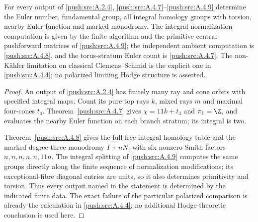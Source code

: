 \begin{corollary}\label{push:src:A.4.5}\label{push:A45}
For every output of \ref{push:src:A.2.4}, \ref{push:src:A.4.7}--\ref{push:src:A.4.9} determine the
Euler number, fundamental group, all integral homology
groups with torsion, nearby Euler function and marked
monodromy. The integral normalization computation is
given by the finite algorithm and the primitive
central pushforward matrices of \ref{push:src:A.4.9}; the independent
ambient computation is \ref{push:src:A.4.8}, and the torus-stratum
Euler count is \ref{push:src:A.4.7}. The non-K\"ahler limitation on
classical Clemens--Schmid is the explicit one in
\ref{push:src:A.4.4}; no polarized limiting Hodge structure is
asserted.
\end{corollary}
\begin{proof}

An output of \ref{push:src:A.2.4} has finitely many ray and
cone orbits with specified integral maps. Count its pure top
rays $k$, mixed rays $m$ and maximal four-cones $t_4$.
Theorem~\ref{push:src:A.4.7} gives $\chi=11k+t_4$ and
$\pi_1=\Z$, and evaluates the nearby Euler function on
each branch stratum; its integral is two.

Theorem~\ref{push:src:A.4.8} gives the full free integral
homology table and the marked degree-three monodromy $I+nN$,
with six nonzero Smith factors $n,n,n,n,n,11n$. The integral
splitting of \ref{push:src:A.4.9} computes the same groups
directly along the finite sequence of normalization modifications;
its exceptional-fibre diagonal entries are units, so it also
determines primitivity and torsion. Thus every output named in
the statement is determined by the indicated finite data.
The exact failure of the particular polarized comparison is
already the calculation in \ref{push:src:A.4.4}; no additional
Hodge-theoretic conclusion is used here.

\end{proof}
